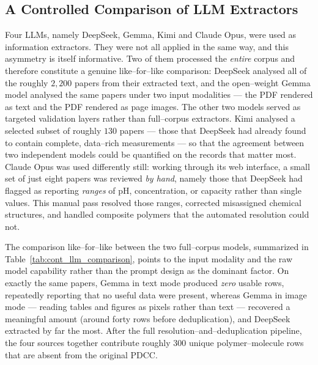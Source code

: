 \subsection{A Controlled Comparison of LLM Extractors}
\label{sec:cont_comparison}
Four LLMs, namely DeepSeek, Gemma, Kimi and Claude Opus, were used as information extractors. They were not all applied in the same way, and this asymmetry is itself informative. Two of them processed the \emph{entire} corpus and therefore constitute a genuine like--for--like comparison: DeepSeek analysed all of the roughly $2{,}200$ papers from their extracted text, and the open--weight Gemma model analysed the same papers under two input modalities --- the PDF rendered as text and the PDF rendered as page images. The other two models served as targeted validation layers rather than full--corpus extractors. Kimi analysed a selected subset of roughly $130$ papers --- those that DeepSeek had already found to contain complete, data--rich measurements --- so that the agreement between two independent models could be quantified on the records that matter most. Claude Opus was used differently still: working through its web interface, a small set of just eight papers was reviewed \emph{by hand}, namely those that DeepSeek had flagged as reporting \emph{ranges} of pH, concentration, or capacity rather than single values. This manual pass resolved those ranges, corrected misassigned chemical structures, and handled composite polymers that the automated resolution could not.

The comparison like--for--like between the two full--corpus models, summarized in Table~\ref{tab:cont_llm_comparison}, points to the input modality and the raw model capability rather than the prompt design as the dominant factor. On exactly the same papers, Gemma in text mode produced \emph{zero} usable rows, repeatedly reporting that no useful data were present, whereas Gemma in image mode --- reading tables and figures as pixels rather than text --- recovered a meaningful amount (around forty rows before deduplication), and DeepSeek extracted by far the most. After the full resolution--and--deduplication pipeline, the four sources together contribute roughly $300$ unique polymer--molecule rows that are absent from the original PDCC.

